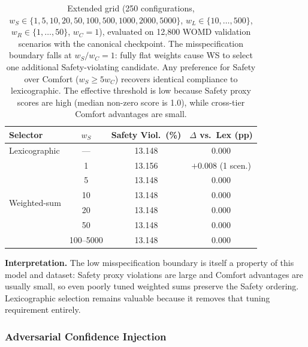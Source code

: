 \begin{table}[t]
\centering
\caption{Extended Weight Grid: Safety-Tier Violations vs.\ Lexicographic Baseline}
\label{tab:misspecification}
\setlength{\tabcolsep}{5pt}
\begin{tabular}{lccc}
\toprule
\textbf{Selector} & \textbf{$w_S$} & \textbf{Safety Viol.\ (\%)} & \textbf{$\Delta$ vs.\ Lex (pp)} \\
\midrule
Lexicographic  & ---  & 13.148 & 0.000 \\
\midrule
\multirow{6}{*}{Weighted-sum} & 1    & 13.156 & $+$0.008  (1 scen.) \\
                              & 5    & 13.148 & 0.000 \\
                              & 10   & 13.148 & 0.000 \\
                              & 20   & 13.148 & 0.000 \\
                              & 50   & 13.148 & 0.000 \\
                              & 100--5000 & 13.148 & 0.000 \\
\bottomrule
\end{tabular}
\vspace{1mm}
\caption*{\footnotesize Extended grid (250 configurations, $w_S \in \{1,5,10,20,50,100,500,1000,2000,5000\}$, $w_L \in \{10,\ldots,500\}$, $w_R \in \{1,\ldots,50\}$, $w_C{=}1$), evaluated on 12{,}800 WOMD validation scenarios with the canonical checkpoint.  The misspecification boundary falls at $w_S/w_C{=}1$: fully flat weights cause WS to select one additional Safety-violating candidate.  Any preference for Safety over Comfort ($w_S \geq 5 w_C$) recovers identical compliance to lexicographic.  The effective threshold is low because Safety proxy scores are high (median non-zero score is 1.0), while cross-tier Comfort advantages are small.}
\end{table}

\noindent\textbf{Interpretation.}
The low misspecification boundary is itself a property of this model and dataset: Safety proxy violations are large and Comfort advantages are usually small, so even poorly tuned weighted sums preserve the Safety ordering.  Lexicographic selection remains valuable because it removes that tuning requirement entirely.

\subsubsection{Adversarial Confidence Injection}
\label{subsubsec:adversarial}

